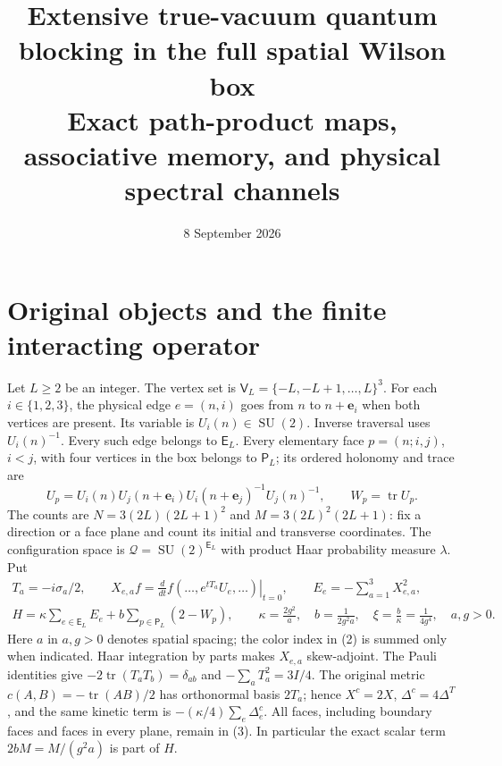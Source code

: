 \documentclass[11pt]{article}
\title{Extensive true-vacuum quantum blocking in the full spatial Wilson box\\
Exact path-product maps, associative memory, and physical spectral channels}
\author{}
\date{8 September 2026}
\newcommand{\SU}{\operatorname{SU}}
\newcommand{\tr}{\operatorname{tr}}
\newcommand{\EE}{\mathsf E}
\newcommand{\PP}{\mathsf P}
\begin{document}
\maketitle

\section{Original objects and the finite interacting operator}

Let $L\geq2$ be an integer. The vertex set is
$\mathsf V_L=\{-L,-L+1,\ldots,L\}^3$. For each $i\in\{1,2,3\}$,
the physical edge $e=(n,i)$ goes from $n$ to $n+\mathbf e_i$ when both
vertices are present. Its variable is $U_i(n)\in\SU(2)$. Inverse traversal
uses $U_i(n)^{-1}$. Every such edge belongs to $\EE_L$. Every elementary
face $p=(n;i,j)$, $i<j$, with four vertices in the box belongs to $\PP_L$;
its ordered holonomy and trace are
\begin{equation}\label{eq:plaquette}
 U_p=U_i(n)U_j(n+\mathbf e_i)U_i(n+\mathbf e_j)^{-1}U_j(n)^{-1},
 \qquad W_p=\tr U_p.
\end{equation}
The counts are $N=3(2L)(2L+1)^2$ and $M=3(2L)^2(2L+1)$: fix a
direction or a face plane and count its initial and transverse coordinates.
The configuration space is $\mathcal Q=\SU(2)^{\EE_L}$ with product
Haar probability measure $\lambda$. Put
\begin{gather}
 T_a=-i\sigma_a/2,\qquad
 X_{e,a}f=\left.\frac{d}{dt}f(\ldots,e^{tT_a}U_e,\ldots)\right|_{t=0},
 \qquad E_e=-\sum_{a=1}^3X_{e,a}^2,\label{eq:fields}\\
 H=\kappa\sum_{e\in\EE_L}E_e+b\sum_{p\in\PP_L}(2-W_p),\qquad
 \kappa=\frac{2g^2}{a},\quad b=\frac{1}{2g^2a},\quad
 \xi=\frac b\kappa=\frac1{4g^4},\quad a,g>0.\label{eq:H}
\end{gather}
Here $a$ in $a,g>0$ denotes spatial spacing; the color index in
(2) is summed only when indicated. Haar integration by parts
makes $X_{e,a}$ skew-adjoint. The Pauli identities give
$-2\tr(T_aT_b)=\delta_{ab}$ and $-\sum_aT_a^2=3I/4$.
The original metric $c(A,B)=-\tr(AB)/2$ has orthonormal basis $2T_a$;
hence $X^c=2X$, $\Delta^c=4\Delta^T$, and the same kinetic term is
$-(\kappa/4)\sum_e\Delta_e^c$. All faces, including boundary faces
and faces in every plane, remain in (3).
In particular the exact scalar term $2bM=M/(g^2a)$ is part of $H$.
\end{document}
